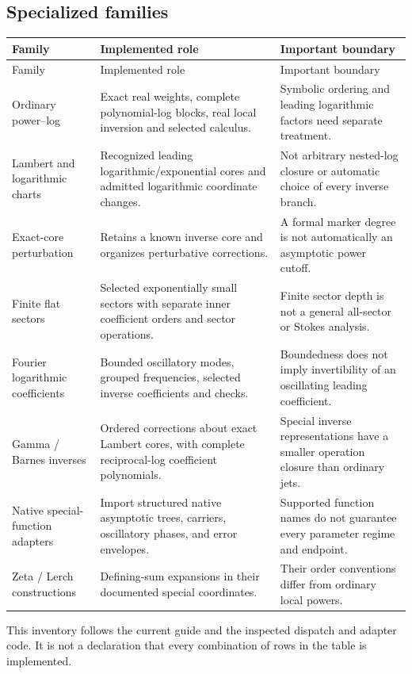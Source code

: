 \subsection{Specialized families}
\begin{longtable}{P{0.23\textwidth}P{0.42\textwidth}P{0.25\textwidth}}
\toprule Family & Implemented role & Important boundary \\\midrule
\endfirsthead
\toprule Family & Implemented role & Important boundary \\\midrule
\endhead
Ordinary power--log & Exact real weights, complete polynomial-log blocks, real local inversion and selected calculus. & Symbolic ordering and leading logarithmic factors need separate treatment. \\
Lambert and logarithmic charts & Recognized leading logarithmic/exponential cores and admitted logarithmic coordinate changes. & Not arbitrary nested-log closure or automatic choice of every inverse branch. \\
Exact-core perturbation & Retains a known inverse core and organizes perturbative corrections. & A formal marker degree is not automatically an asymptotic power cutoff. \\
Finite flat sectors & Selected exponentially small sectors with separate inner coefficient orders and sector operations. & Finite sector depth is not a general all-sector or Stokes analysis. \\
Fourier logarithmic coefficients & Bounded oscillatory modes, grouped frequencies, selected inverse coefficients and checks. & Boundedness does not imply invertibility of an oscillating leading coefficient. \\
Gamma / Barnes inverses & Ordered corrections about exact Lambert cores, with complete reciprocal-log coefficient polynomials. & Special inverse representations have a smaller operation closure than ordinary jets. \\
Native special-function adapters & Import structured native asymptotic trees, carriers, oscillatory phases, and error envelopes. & Supported function names do not guarantee every parameter regime and endpoint. \\
Zeta / Lerch constructions & Defining-sum expansions in their documented special coordinates. & Their order conventions differ from ordinary local powers. \\
\bottomrule
\end{longtable}
This inventory follows the current guide and the inspected dispatch and adapter code. It is not a declaration that every combination of rows in the table is implemented.\cite{guide,sourcecharts,gamma,native,inverseexpressions}

